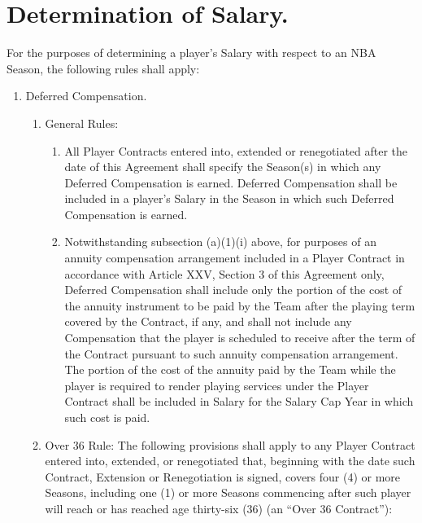 \documentclass[
]{book}
\providecommand{\tightlist}{%
  \setlength{\itemsep}{0pt}\setlength{\parskip}{0pt}}
\begin{document}
\hypertarget{determination-of-salary.}{%
\section{Determination of Salary.}\label{determination-of-salary.}}

For the purposes of determining a player's Salary with respect to an NBA Season, the following rules shall apply:

\begin{enumerate}
\def\labelenumi{(\alph{enumi})}
\tightlist
\item
  Deferred Compensation.

  \begin{enumerate}
  \def\labelenumii{(\arabic{enumii})}
  \tightlist
  \item
    General Rules:

    \begin{enumerate}
    \def\labelenumiii{(\roman{enumiii})}
    \tightlist
    \item
      All Player Contracts entered into, extended or renegotiated after the date of this Agreement shall specify the Season(s) in which any Deferred Compensation is earned. Deferred Compensation shall be included in a player's Salary in the Season in which such Deferred Compensation is earned.
    \item
      Notwithstanding subsection (a)(1)(i) above, for purposes of an annuity compensation arrangement included in a Player Contract in accordance with Article XXV, Section 3 of this Agreement only, Deferred Compensation shall include only the portion of the cost of the annuity instrument to be paid by the Team after the playing term covered by the Contract, if any, and shall not include any Compensation that the player is scheduled to receive after the term of the Contract pursuant to such annuity compensation arrangement. The portion of the cost of the annuity paid by the Team while the player is required to render playing services under the Player Contract shall be included in Salary for the Salary Cap Year in which such cost is paid.
    \end{enumerate}
  \item
    Over 36 Rule: The following provisions shall apply to any Player Contract entered into, extended, or renegotiated that, beginning with the date such Contract, Extension or Renegotiation is signed, covers four (4) or more Seasons, including one (1) or more Seasons commencing after such player will reach or has reached age thirty-six (36) (an ``Over 36 Contract''):


\end{enumerate}
\end{enumerate}
\end{document}
